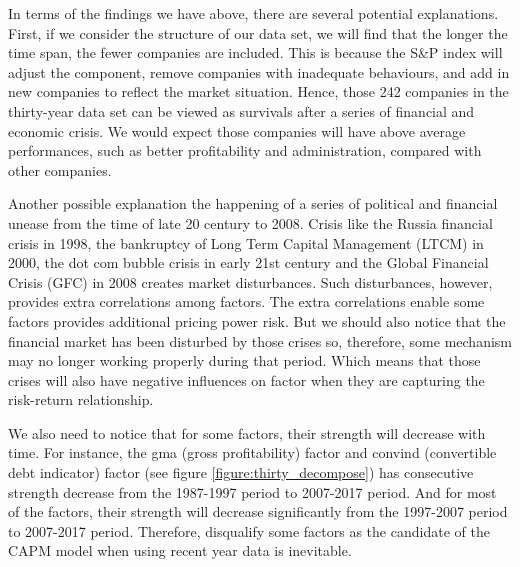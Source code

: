 In terms of the findings we have above, there are several potential explanations.
First, if we consider the structure of our data set, we will find that the longer the time span, the fewer companies are included.
This is because the S\&P index will adjust the component, remove companies with inadequate behaviours, and add in new companies to reflect the market situation.
Hence, those 242 companies in the thirty-year data set can be viewed as survivals after a series of financial and economic crisis.
We would expect those companies will have above average performances, such as better profitability and administration, compared with other companies. 


Another possible explanation the happening of a series of political and financial unease from the time of late 20 century to 2008.
Crisis like the Russia financial crisis in 1998, the bankruptcy of Long Term Capital Management (LTCM) in 2000, the dot com bubble crisis in early 21st century and the Global Financial Crisis (GFC) in 2008 creates market disturbances.
Such disturbances, however, provides extra correlations among factors.
The extra correlations enable some factors provides additional pricing power risk.
But we should also notice that the financial market has been disturbed by those crises so, therefore, some mechanism may no longer working properly during that period.
Which means that those crises will also have negative influences on factor when they are capturing the risk-return relationship.

We also need to notice that for some factors, their strength will decrease with time.
For instance, the gma (gross profitability) factor and convind (convertible debt indicator) factor (see figure \ref{figure:thirty_decompose}) has consecutive strength decrease from the 1987-1997 period to 2007-2017 period.
And for most of the factors, their strength will decrease significantly from the 1997-2007 period to 2007-2017 period.
Therefore, disqualify some factors as the candidate of the CAPM model when using recent year data is inevitable.





